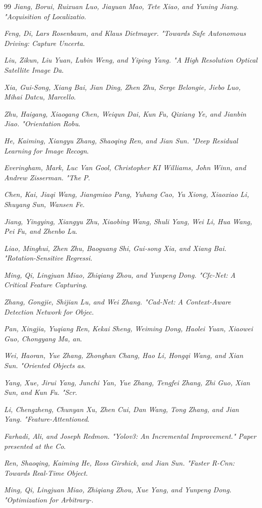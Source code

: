 \documentclass[journal]{IEEEtran}
\begin{document}
\begin{thebibliography}{99}
\textit{Jiang, Borui, Ruixuan Luo, Jiayuan Mao, Tete Xiao, and Yuning Jiang. "Acquisition of Localizatio}.

\textit{Feng, Di, Lars Rosenbaum, and Klaus Dietmayer. "Towards Safe Autonomous Driving: Capture Uncerta}.

\textit{Liu, Zikun, Liu Yuan, Lubin Weng, and Yiping Yang. "A High Resolution Optical Satellite Image Da}.

\textit{Xia, Gui-Song, Xiang Bai, Jian Ding, Zhen Zhu, Serge Belongie, Jiebo Luo, Mihai Datcu, Marcello}.

\textit{Zhu, Haigang, Xiaogang Chen, Weiqun Dai, Kun Fu, Qixiang Ye, and Jianbin Jiao. "Orientation Robu}.

\textit{He, Kaiming, Xiangyu Zhang, Shaoqing Ren, and Jian Sun. "Deep Residual Learning for Image Recogn}.

\textit{Everingham, Mark, Luc Van Gool, Christopher KI Williams, John Winn, and Andrew Zisserman. "The P}.

\textit{Chen, Kai, Jiaqi Wang, Jiangmiao Pang, Yuhang Cao, Yu Xiong, Xiaoxiao Li, Shuyang Sun, Wansen Fe}.

\textit{Jiang, Yingying, Xiangyu Zhu, Xiaobing Wang, Shuli Yang, Wei Li, Hua Wang, Pei Fu, and Zhenbo Lu}.

\textit{Liao, Minghui, Zhen Zhu, Baoguang Shi, Gui-song Xia, and Xiang Bai. "Rotation-Sensitive Regressi}.

\textit{Ming, Qi, Lingjuan Miao, Zhiqiang Zhou, and Yunpeng Dong. "Cfc-Net: A Critical Feature Capturing}.

\textit{Zhang, Gongjie, Shijian Lu, and Wei Zhang. "Cad-Net: A Context-Aware Detection Network for Objec}.

\textit{Pan, Xingjia, Yuqiang Ren, Kekai Sheng, Weiming Dong, Haolei Yuan, Xiaowei Guo, Chongyang Ma, an}.

\textit{Wei, Haoran, Yue Zhang, Zhonghan Chang, Hao Li, Hongqi Wang, and Xian Sun. "Oriented Objects as}.

\textit{Yang, Xue, Jirui Yang, Junchi Yan, Yue Zhang, Tengfei Zhang, Zhi Guo, Xian Sun, and Kun Fu. "Scr}.

\textit{Li, Chengzheng, Chunyan Xu, Zhen Cui, Dan Wang, Tong Zhang, and Jian Yang. "Feature-Attentioned}.

\textit{Farhadi, Ali, and Joseph Redmon. "Yolov3: An Incremental Improvement." Paper presented at the Co}.

\textit{Ren, Shaoqing, Kaiming He, Ross Girshick, and Jian Sun. "Faster R-Cnn: Towards Real-Time Object}.

\textit{Ming, Qi, Lingjuan Miao, Zhiqiang Zhou, Xue Yang, and Yunpeng Dong. "Optimization for Arbitrary-}.

\end{thebibliography}
\end{document}
